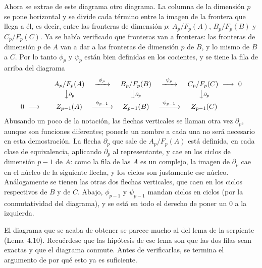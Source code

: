 \documentclass[11pt]{article}
\begin{document}
Ahora se extrae de este diagrama otro diagrama. La columna de la dimensión $p$ se pone horizontal y se divide cada término entre la imagen de la frontera que llega a él, es decir, entre las fronteras de dimensión $p$: $A_p/F_p(A)$, $B_p/F_p(B)$ y $C_p/F_p(C)$. Ya se había verificado que fronteras van a fronteras: las fronteras de dimensión $p$ de $A$ van a dar a las fronteras de dimensión $p$ de $B$, y lo mismo de $B$ a $C$. Por lo tanto $\phi_p$ y $\psi_p$ están bien definidas en los cocientes, y se tiene la fila de arriba del diagrama
\[
  \begin{array}{ccccccc}
    & & A_p/F_p(A) & \xrightarrow{\ \phi_p\ } & B_p/F_p(B) & \xrightarrow{\ \psi_p\ } & C_p/F_p(C)\ \longrightarrow\ 0\\[2pt]
    & & \big\downarrow{\scriptstyle\partial_p} & & \big\downarrow{\scriptstyle\partial_p} & & \big\downarrow{\scriptstyle\partial_p}\qquad\quad\\[2pt]
    0\ \longrightarrow & & Z_{p-1}(A) & \xrightarrow{\ \phi_{p-1}\ } & Z_{p-1}(B) & \xrightarrow{\ \psi_{p-1}\ } & Z_{p-1}(C)\qquad\quad
  \end{array}
\]
Abusando un poco de la notación, las flechas verticales se llaman otra vez $\partial_p$, aunque son funciones diferentes; ponerle un nombre a cada una no será necesario en esta demostración. La flecha $\partial_p$ que sale de $A_p/F_p(A)$ está definida, en cada clase de equivalencia, aplicando $\partial_p$ al representante, y cae en los ciclos de dimensión $p-1$ de $A$: como la fila de las $A$ es un complejo, la imagen de $\partial_p$ cae en el núcleo de la siguiente flecha, y los ciclos son justamente ese núcleo. Análogamente se tienen las otras dos flechas verticales, que caen en los ciclos respectivos de $B$ y de $C$. Abajo, $\phi_{p-1}$ y $\psi_{p-1}$ mandan ciclos en ciclos (por la conmutatividad del diagrama), y se está en todo el derecho de poner un $0$ a la izquierda.

El diagrama que se acaba de obtener se parece mucho al del lema de la serpiente (Lema~4.10). Recuérdese que las hipótesis de ese lema son que las dos filas sean exactas y que el diagrama conmute. Antes de verificarlas, se termina el argumento de por qué esto ya es suficiente.
\end{document}
